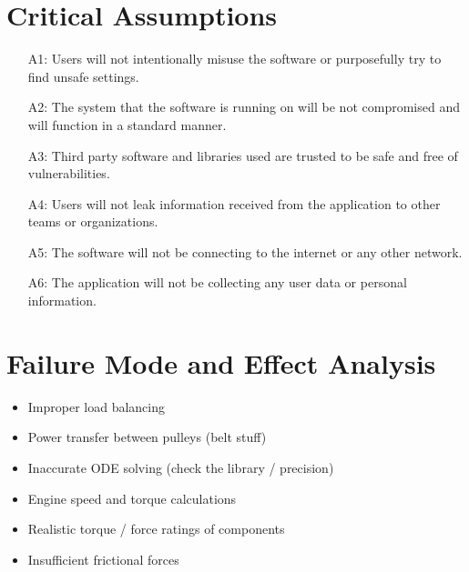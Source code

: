 \documentclass{article}
\begin{document}
\section{Critical Assumptions}


\begin{itemize}
    \item [A1:] Users will not intentionally misuse the software or purposefully try to find unsafe settings.
    \item [A2:] The system that the software is running on will be not compromised and will function in a standard manner.
    \item [A3:] Third party software and libraries used are trusted to be safe and free of vulnerabilities.
    \item [A4:] Users will not leak information received from the application to other teams or organizations. 
    \item [A5:] The software will not be connecting to the internet or any other network.
    \item [A6:] The application will not be collecting any user data or personal information.
\end{itemize}


\section{Failure Mode and Effect Analysis}



\begin{itemize}
    \item Improper load balancing
    \item Power transfer between pulleys (belt stuff)
    \item Inaccurate ODE solving (check the library / precision)
    \item Engine speed and torque calculations 
    \item Realistic torque / force ratings of components
    \item Insufficient frictional forces
\end{itemize}
\end{document}
